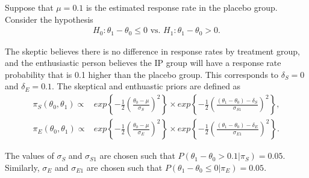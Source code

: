 \documentclass[12pt]{article}
\begin{document}
Suppose that $\mu=0.1$ is the estimated response rate in the placebo group.
Consider the hypothesis
\begin{align*}
H_0:\theta_1-\theta_0\leq 0\text{ vs. }H_1: \theta_1-\theta_0>0.
\end{align*}

The skeptic believes there is no difference in response rates by treatment group, and the enthusiastic person believes the IP group will have a response rate probability that is 0.1 higher than the placebo group. This corresponds to $\delta_S=0$ and $\delta_E=0.1$. The skeptical and enthuastic priors are defined as
\begin{align*}
\pi_S(\theta_0,\theta_1)\propto&exp\left\{-\frac{1}{2}\left(\frac{\theta_0-\mu}{\sigma_S}\right)^{2}\right\}\times exp\left\{-\frac{1}{2}\left(\frac{(\theta_1-\theta_0)-\delta_S}{\sigma_{S1}}\right)^{2}\right\},\\
\pi_E(\theta_0,\theta_1)\propto&exp\left\{-\frac{1}{2}\left(\frac{\theta_0-\mu}{\sigma_E}\right)^{2}\right\}\times exp\left\{-\frac{1}{2}\left(\frac{(\theta_1-\theta_0)-\delta_E}{\sigma_{E1}}\right)^{2}\right\}.
\end{align*}

The values of $\sigma_S$ and $\sigma_{S1}$ are chosen such that $P(\theta_1-\theta_0>0.1|\pi_S)=0.05$. Similarly, $\sigma_E$ and $\sigma_{E1}$ are chosen such that $P(\theta_1-\theta_0\leq0|\pi_E)=0.05$.







%				



\newpage
\end{document}
